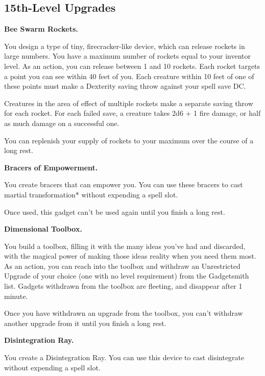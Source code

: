 \documentclass[11pt,twoside,openany]{book}  %
\begin{document}
\subsection{15th-Level Upgrades}
\begin{fiveitemize}

	\item \textbf{Bee Swarm Rockets.}
	
	You design a type of tiny, firecracker-like device, which can release rockets in large numbers. You have a maximum number of rockets equal to your inventor level. As an action, you can release between 1 and 10 rockets. Each rocket targets a point you can see within 40 feet of you. Each creature within 10 feet of one of these points must make a Dexterity saving throw against your spell save DC.

	Creatures in the area of effect of multiple rockets make a separate saving throw for each rocket. For each failed save, a creature takes 2d6 + 1 fire damage, or half as much damage on a successful one.

	You can replenish your supply of rockets to your maximum over the course of a long rest.

	\item \textbf{Bracers of Empowerment.}
	
	You create bracers that can empower you. You can use these bracers to cast martial transformation* without expending a spell slot.

	Once used, this gadget can’t be used again until you finish a long rest.

	\item \textbf{Dimensional Toolbox.}
	
	You build a toolbox, filling it with the many ideas you’ve had and discarded, with the magical power of making those ideas reality when you need them most. As an action, you can reach into the toolbox and withdraw an Unrestricted Upgrade of your choice (one with no level requirement) from the Gadgetsmith list. Gadgets withdrawn from the toolbox are fleeting, and disappear after 1 minute.

	Once you have withdrawn an upgrade from the toolbox, you can’t withdraw another upgrade from it until you finish a long rest.

	\item \textbf{Disintegration Ray.}
	
	You create a Disintegration Ray. You can use this device to cast disintegrate without expending a spell slot.


\end{fiveitemize}
\end{document}
